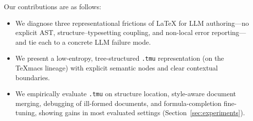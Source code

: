 Our contributions are as follows:
\vspace{-0.35em}
\begin{itemize}
    \setlength{\itemsep}{0.15em}
    \setlength{\parsep}{0pt}
    \setlength{\parskip}{0pt}
    \item We diagnose three representational frictions of {\LaTeX} for LLM authoring---no explicit AST, structure--typesetting coupling, and non-local error reporting---and tie each to a concrete LLM failure mode.
    \item We present a low-entropy, tree-structured \texttt{.tmu} representation (on the {\TeX}macs lineage) with explicit semantic nodes and clear contextual boundaries.
    \item We empirically evaluate \texttt{.tmu} on structure location, style-aware document merging, debugging of ill-formed documents, and formula-completion fine-tuning, showing gains in most evaluated settings (Section~\ref{sec:experiments}).
\end{itemize}

